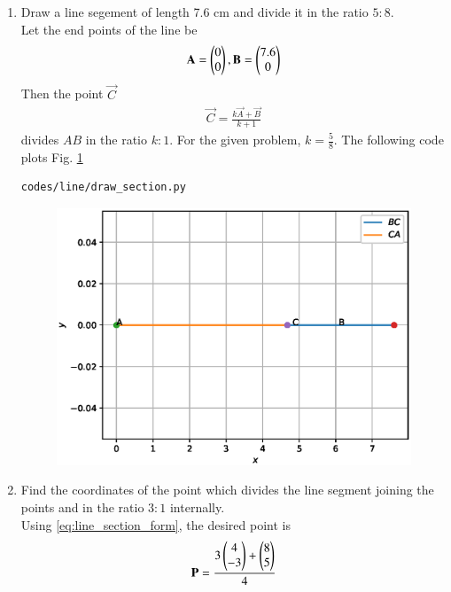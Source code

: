 \begin{enumerate}[label=\arabic*.,ref=\thesubsection.\theenumi]
\item Draw a line segement of length 7.6 cm and divide it in the ratio $5:8$.
\\
\solution Let the end points of the line be 
\begin{align}
\mathbf{A} = \begin{pmatrix}0\\0\end{pmatrix}, \mathbf{B} = \begin{pmatrix}7.6\\0\end{pmatrix}
\end{align}
Then the point $\vec{C}$
\begin{align}
\label{eq:line_section_form}
\vec{C} = \frac{k \vec{A} + \vec{B}}{k+1}
\end{align}
divides $AB$ in the ratio $k:1$. For the given problem, $k = \frac{5}{8}$.
The following code plots Fig. \ref{fig:section}
\begin{lstlisting}
codes/line/draw_section.py
\end{lstlisting}
\begin{figure}[!ht]
\includegraphics[width=\columnwidth]{./line/figs/section.eps}
\caption{}
\label{fig:section}
\end{figure}
\item Find the coordinates of the point which divides the line segment joining the points  and  in the ratio $3:1$ internally.
\\
\solution Using \eqref{eq:line_section_form},
the desired point is 
\begin{align}
\mathbf{P} = \frac{3 \begin{pmatrix}4\\-3\end{pmatrix} + \begin{pmatrix}8\\5\end{pmatrix}}{4}
\end{align}

\end{enumerate}
